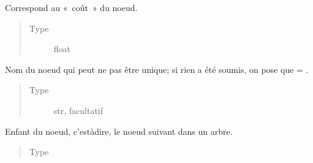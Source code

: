 \documentclass[letterpaper,10pt,french]{sphinxmanual}
\begin{document}
\begin{fulllineitems}
\begin{fulllineitems}
\begin{quote}
\begin{description}
\end{description}\end{quote}

\end{fulllineitems}


\begin{fulllineitems}
\label{\detokenize{index:StrategyTree.Repair._cost}}
Correspond au « coût » du noeud.
\begin{quote}\begin{description}
\item[{Type}] \leavevmode
float

\end{description}\end{quote}

\end{fulllineitems}


\begin{fulllineitems}
\label{\detokenize{index:StrategyTree.Repair.name}}
Nom du noeud qui peut ne pas être unique; si rien a été soumis, on pose
que  = .
\begin{quote}\begin{description}
\item[{Type}] \leavevmode
str, facultatif

\end{description}\end{quote}

\end{fulllineitems}


\begin{fulllineitems}
\label{\detokenize{index:StrategyTree.Repair._child}}
Enfant du noeud, c’est\sphinxhyphen{}à\sphinxhyphen{}dire, le noeud suivant dans un arbre.
\begin{quote}\begin{description}
\item[{Type}] \leavevmode
{\hyperref[\detokenize{index:StrategyTree.NodeST}]{}}


\end{description}
\end{quote}
\end{fulllineitems}
\end{fulllineitems}
\end{document}
